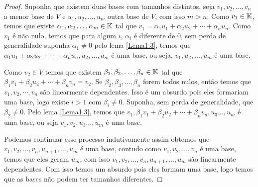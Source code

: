 \begin{proof}
Suponha que existem duas bases com tamanhos distintos, seja $v_1,v_2,\dots,v_n$ a menor base de $V$ e $u_1,u_2,\dots,u_m$ outra base de $V$, com isso $m>n$.
Como $v_1 \in \mathbb{K}$, temos que existe $\alpha_1,\alpha_2\dots,\alpha_m \in \mathbb{K}$ tal que $v_1 = \alpha_1 u_1 + \alpha_2 u_2 + \cdots + \alpha_n u_n$.
Como $v_1$ é não nulo, temos que para algum $i$, $\alpha_i$ é diferente de 0, sem perda de generalidade suponha $\alpha_1 \ne 0$
 pelo lema \ref{Lema1.3}, temos que  $\alpha_1 u_1 + \alpha_2 u_2 + \cdots + \alpha_n u_n,u_2,\dots,u_m$ é uma base, ou seja, $v_1,u_2,\dots,u_m$ é uma base.
 
Como $v_2 \in V$ temos que existem $\beta_1,\beta_2,\dots,\beta_n \in \mathbb{K}$ tal que $\beta_1 v_1 + \beta_2 u_2 + \cdots + \beta_n v_n = v_2$.
Se $\beta_2, \beta_3, \dots, \beta_n$ forem todos nulos, então temos que $v_1, v_2, \cdots, v_n$ são linearmente dependentes. Isso é um absurdo pois eles formariam uma base, logo existe $i>1$ com $\beta_i \neq 0$.
Suponha, sem perda de generalidade, que $\beta_2 \ne 0$. Pelo lema \ref{Lema1.3}, temos que $v_1,\beta_1 v_1 + \beta_2 u_2 + \cdots + \beta_n v_n,u_3\dots,u_m$ é uma base, ou seja $v_1,v_2,u_3\dots,u_m$ é uma base.

Podemos continuar esse processo indutivamente assim obtemos que $v_1,v_2,\dots,v_n,u_{n+1},\dots,u_m$ é uma base,
contudo como $v_1,v_2,\dots,v_n$ é uma base, temos que eles geram $u_m$, com isso $v_1,v_2,\dots,v_n,u_{n+1},\dots,u_m$ são linearmente dependentes. Com isso temos um absurdo pois eles formam uma base, logo temos que as bases não podem ter tamanhos diferentes.
\end{proof}
